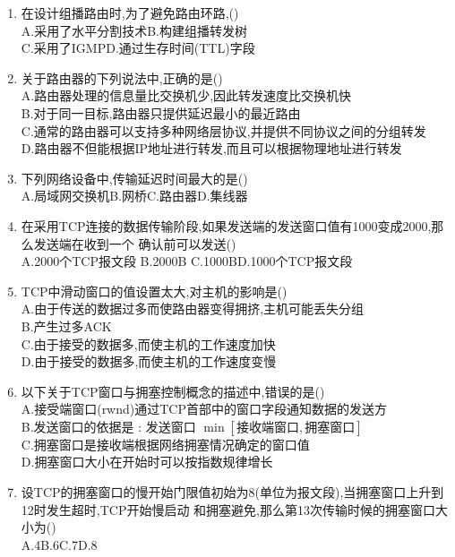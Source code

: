 \documentclass[12pt, a4paper, oneside, UTF8]{ctexbook}
\begin{document}
\begin{enumerate}
    \item 在设计组播路由时,为了避免路由环路,() \\
    A.采用了水平分割技术\qquad B.构建组播转发树\\ 
    C.采用了IGMP\qquad D.通过生存时间(TTL)字段 

    \item 关于路由器的下列说法中,正确的是() \\
    A.路由器处理的信息量比交换机少,因此转发速度比交换机快 \\
    B.对于同一目标,路由器只提供延迟最小的最近路由 \\
    C.通常的路由器可以支持多种网络层协议,并提供不同协议之间的分组转发 \\
    D.路由器不但能根据IP地址进行转发,而且可以根据物理地址进行转发

    \item 下列网络设备中,传输延迟时间最大的是() \\
    A.局域网交换机\qquad B.网桥\qquad C.路由器\qquad D.集线器 

    \item 在采用TCP连接的数据传输阶段,如果发送端的发送窗口值有1000变成2000,那么发送端在收到一个
    确认前可以发送() \\
    A.2000个TCP报文段 \qquad B.2000B \qquad C.1000B\qquad D.1000个TCP报文段

    \item TCP中滑动窗口的值设置太大,对主机的影响是() \\
    A.由于传送的数据过多而使路由器变得拥挤,主机可能丢失分组 \\
    B.产生过多ACK \\
    C.由于接受的数据多,而使主机的工作速度加快 \\
    D.由于接受的数据多,而使主机的工作速度变慢 

    \item 以下关于TCP窗口与拥塞控制概念的描述中,错误的是() \\
    A.接受端窗口(rwnd)通过TCP首部中的窗口字段通知数据的发送方 \\
    B.发送窗口的依据是 : 发送窗口 $\min{\left[\text{接收端窗口},\text{拥塞窗口}\right]}$ \\
    C.拥塞窗口是接收端根据网络拥塞情况确定的窗口值 \\
    D.拥塞窗口大小在开始时可以按指数规律增长

    \item 设TCP的拥塞窗口的慢开始门限值初始为8(单位为报文段),当拥塞窗口上升到12时发生超时,TCP开始慢启动
    和拥塞避免,那么第13次传输时候的拥塞窗口大小为() \\
    A.4\qquad B.6\qquad C.7\qquad D.8


\end{enumerate}
\end{document}
